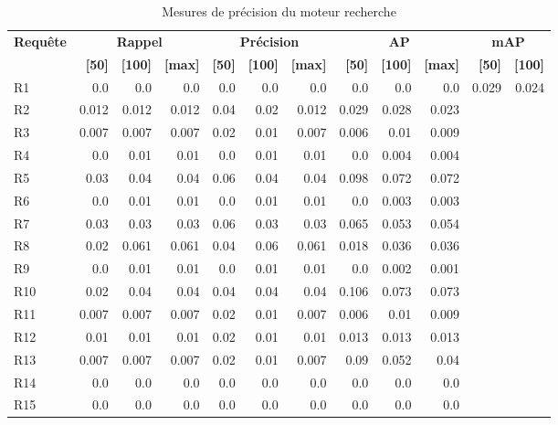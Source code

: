 \begin{table}[H]
\centering
\begin{tabular}{l|rrr|rrr|rrr|rr}
\toprule
\textbf{Requête} & \multicolumn{3}{c}{\textbf{Rappel}} & \multicolumn{3}{c}{\textbf{Précision}} & \multicolumn{3}{c}{\textbf{AP}} & \multicolumn{2}{c}{\textbf{mAP}} \\
 & \textbf{[50]} & \textbf{[100]} & \textbf{[max]} & \textbf{[50]} & \textbf{[100]} & \textbf{[max]} & \textbf{[50]} & \textbf{[100]} & \textbf{[max]} & \textbf{[50]} & \textbf{[100]} \\
\midrule
R1 & 0.0 & 0.0 & 0.0 & 0.0 & 0.0 & 0.0 & 0.0 & 0.0 & 0.0 & \multirow{15}{*}{0.029} & \multirow{15}{*}{0.024} \\
R2 & 0.012 & 0.012 & 0.012 & 0.04 & 0.02 & 0.012 & 0.029 & 0.028 & 0.023 \\
R3 & 0.007 & 0.007 & 0.007 & 0.02 & 0.01 & 0.007 & 0.006 & 0.01 & 0.009 \\
R4 & 0.0 & 0.01 & 0.01 & 0.0 & 0.01 & 0.01 & 0.0 & 0.004 & 0.004 \\
R5 & 0.03 & 0.04 & 0.04 & 0.06 & 0.04 & 0.04 & 0.098 & 0.072 & 0.072 \\
R6 & 0.0 & 0.01 & 0.01 & 0.0 & 0.01 & 0.01 & 0.0 & 0.003 & 0.003 \\
R7 & 0.03 & 0.03 & 0.03 & 0.06 & 0.03 & 0.03 & 0.065 & 0.053 & 0.054 \\
R8 & 0.02 & 0.061 & 0.061 & 0.04 & 0.06 & 0.061 & 0.018 & 0.036 & 0.036 \\
R9 & 0.0 & 0.01 & 0.01 & 0.0 & 0.01 & 0.01 & 0.0 & 0.002 & 0.001 \\
R10 & 0.02 & 0.04 & 0.04 & 0.04 & 0.04 & 0.04 & 0.106 & 0.073 & 0.073 \\
R11 & 0.007 & 0.007 & 0.007 & 0.02 & 0.01 & 0.007 & 0.006 & 0.01 & 0.009 \\
R12 & 0.01 & 0.01 & 0.01 & 0.02 & 0.01 & 0.01 & 0.013 & 0.013 & 0.013 \\
R13 & 0.007 & 0.007 & 0.007 & 0.02 & 0.01 & 0.007 & 0.09 & 0.052 & 0.04 \\
R14 & 0.0 & 0.0 & 0.0 & 0.0 & 0.0 & 0.0 & 0.0 & 0.0 & 0.0 \\
R15 & 0.0 & 0.0 & 0.0 & 0.0 & 0.0 & 0.0 & 0.0 & 0.0 & 0.0 \\
\bottomrule
\end{tabular}
\caption{Mesures de précision du moteur recherche}
\label{tab:results}
\end{table}
